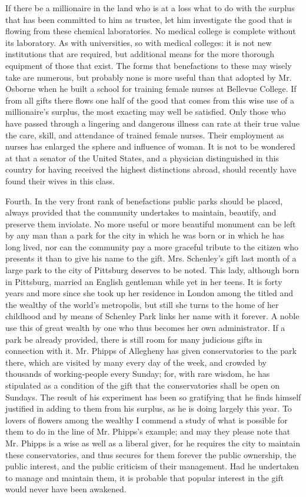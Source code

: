 \documentclass[11pt,openany]{book}
\begin{document}
If there be a millionaire in the land who is at a loss what to do with the surplus that has been committed to him as trustee, let him investigate the good that is flowing from these chemical laboratories. No medical college is complete without its laboratory. As with universities, so with medical colleges: it is not new institutions that are required, but additional means for the more thorough equipment of those that exist. The forms that benefactions to these may wisely take are numerous, but probably none is more useful than that adopted by Mr. Osborne when he built a school for training female nurses at Bellevue College. If from all gifts there flows one half of the good that comes from this wise use of a millionaire's surplus, the most exacting may well be satisfied. Only those who have passed through a lingering and dangerous illness can rate at their true value the care, skill, and attendance of trained female nurses. Their employment as nurses has enlarged the sphere and influence of woman. It is not to be wondered at that a senator of the United States, and a physician distinguished in this country for having received the highest distinctions abroad, should recently have found their wives in this class.

Fourth. In the very front rank of benefactions public parks should be placed, always provided that the community undertakes to maintain, beautify, and preserve them inviolate. No more useful or more beautiful monument can be left by any man than a park for the city in which he was born or in which he has long lived, nor can the community pay a more graceful tribute to the citizen who presents it than to give his name to the gift. Mrs. Schenley's gift last month of a large park to the city of Pittsburg deserves to be noted. This lady, although born in Pittsburg, married an English gentleman while yet in her teens. It is forty years and more since she took up her residence in London among the titled and the wealthy of the world's metropolis, but still she turns to the home of her childhood and by means of Schenley Park links her name with it forever. A noble use this of great wealth by one who thus becomes her own administrator. If a park be already provided, there is still room for many judicious gifts in connection with it. Mr. Phipps of Allegheny has given conservatories to the park there, which are visited by many every day of the week, and crowded by thousands of working-people every Sunday; for, with rare wisdom, he has stipulated as a condition of the gift that the conservatories shall be open on Sundays. The result of his experiment has been so gratifying that he finds himself justified in adding to them from his surplus, as he is doing largely this year. To lovers of flowers among the wealthy I commend a study of what is possible for them to do in the line of Mr. Phipps's example; and may they please note that Mr. Phipps is a wise as well as a liberal giver, for he requires the city to maintain these conservatories, and thus secures for them forever the public ownership, the public interest, and the public criticism of their management. Had he undertaken to manage and maintain them, it is probable that popular interest in the gift would never have been awakened.
\end{document}
